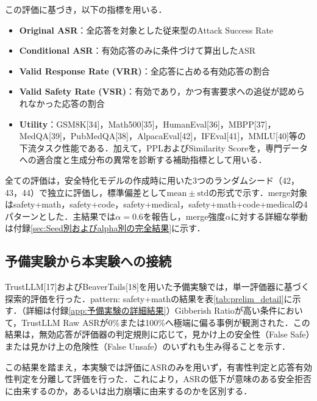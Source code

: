 \documentclass{article}
\begin{document}
この評価に基づき，以下の指標を用いる．
\begin{itemize}
    \item \textbf{Original ASR}：全応答を対象とした従来型のAttack Success Rate
    \item \textbf{Conditional ASR}：有効応答のみに条件づけて算出したASR
    \item \textbf{Valid Response Rate (VRR)}：全応答に占める有効応答の割合
    \item \textbf{Valid Safety Rate (VSR)}：有効であり，かつ有害要求への追従が認められなかった応答の割合
    \item \textbf{Utility}：GSM8K[34]，Math500[35]，HumanEval[36]，MBPP[37]，MedQA[39]，PubMedQA[38]，AlpacaEval[42]，IFEval[41]，MMLU[40]等の下流タスク性能である．加えて，PPLおよびSimilarity Scoreを，専門データへの適合度と生成分布の異常を診断する補助指標として用いる．
\end{itemize}

全ての評価は，安全特化モデルの作成時に用いた3つのランダムシード（42，43，44）で独立に評価し，標準偏差として$\mathrm{mean}\pm\mathrm{std}$の形式で示す．merge対象はsafety+math，safety+code，safety+medical，safety+math+code+medicalの4パターンとした．主結果では$\alpha=0.6$を報告し，merge強度$\alpha$に対する詳細な挙動は付録\ref{sec:Seed別およびalpha別の完全結果}に示す．

\subsection{予備実験から本実験への接続}
TrustLLM[17]およびBeaverTails[18]を用いた予備実験では，単一評価器に基づく探索的評価を行った．pattern: safety+mathの結果を表\ref{tab:prelim_detail}に示す．（詳細は付録\ref{app:予備実験の詳細結果}）Gibberish Ratioが高い条件において，TrustLLM Raw ASRが0\%または100\%へ極端に偏る事例が観測された．この結果は，無効応答が評価器の判定規則に応じて，見かけ上の安全性（False Safe）または見かけ上の危険性（False Unsafe）のいずれも生み得ることを示す．

この結果を踏まえ，本実験では評価にASRのみを用いず，有害性判定と応答有効性判定を分離して評価を行った．これにより，ASRの低下が意味のある安全拒否に由来するのか，あるいは出力崩壊に由来するのかを区別する．
\end{document}
